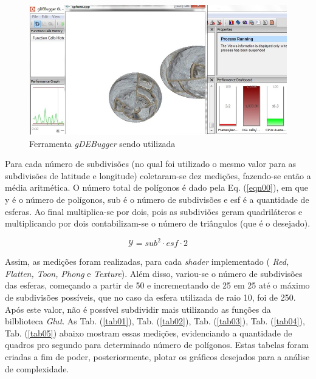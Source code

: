 	\begin{figure}[h]
	\centering
		\includegraphics[keepaspectratio=true,scale=0.8]{figuras/gdebugger.jpg}
	\caption{Ferramenta \textit{gDEBugger} sendo utilizada}
	\label{gdebugger}
	\end{figure}

	 Para cada número de subdivisões (no qual foi utilizado o mesmo valor para as subdivisões de latitude e longitude) coletaram-se dez medições, fazendo-se então a média aritmética. O número total de polígonos é dado pela Eq. 
(\ref{eqn00}), em que y é o número de polígonos, sub é o número de subdivisões e esf é a quantidade de esferas. Ao final multiplica-se por dois, pois as subdiviões geram quadriláteros e multiplicando por dois contabilizam-se o número de triângulos (que é o desejado).

	\begin{equation}
	\label{eqn00}
		\mathcal{Y} = sub^{2} \cdot esf \cdot 2
	\end{equation}

	Assim, as medições foram realizadas, para cada \textit{shader} implementado ( \textit{Red, Flatten, Toon, Phong} e  \textit{Texture}). Além disso, variou-se o número de subdivisões das esferas, começando a partir de 50 e incrementando de 25 em 25 até o máximo de subdivisões possíveis, que no caso da esfera utilizada de raio 10, foi de 250. Após este valor, não é possível subdividir mais utilizando as funções da bilblioteca \textit{Glut}. As Tab. (\ref{tab01}), Tab. (\ref{tab02}), Tab. (\ref{tab03}), Tab. (\ref{tab04}), Tab. (\ref{tab05}) abaixo mostram essas medições, evidenciando a quantidade de quadros pro segundo para determinado número de polígonos.  Estas tabelas foram criadas a fim de poder, posteriormente, plotar os gráficos desejados para a análise de complexidade. 

